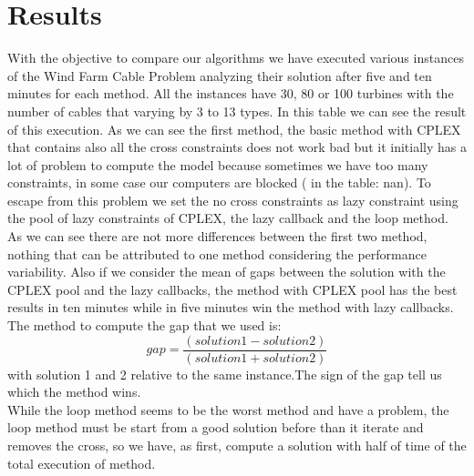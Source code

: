 \section{Results}
With the objective to compare our algorithms we have executed various instances
of the Wind Farm Cable Problem analyzing their solution after five and ten minutes for each method. All the instances have 30, 80 or 100 turbines with the number of cables that varying by 3 to 13 types. In this table we can see the result of this execution. As we can see the first method, the basic method with \textsc{CPLEX} that contains also all the cross constraints does not work bad but it initially has a lot of problem to compute the model because sometimes we have too many constraints, in some case our computers are blocked ( in the table: nan). To escape from this problem we set the no cross constraints as lazy constraint using the pool of lazy constraints of \textsc{CPLEX}, the lazy callback and the loop method. As we can see there are not more differences between the first two method, nothing that can be attributed to one method considering the performance variability. Also if we consider the mean of gaps between the solution with the \textsc{CPLEX} pool and the lazy callbacks, the method with \textsc{CPLEX} pool has the best results in ten minutes while in five minutes win the method with lazy callbacks. The method to compute the gap that we used is:
\[gap = \frac{(solution 1 - solution 2)}{(solution 1 + solution 2)}\] with solution 1 and 2 relative to the same instance.The sign of the gap tell us which the method wins.\\
While the loop method seems to be the worst method and have a problem, the loop method must be start from a good solution before than it iterate and removes the cross, so we have, as first, compute a solution with half of time of the total execution of method. \\ 


